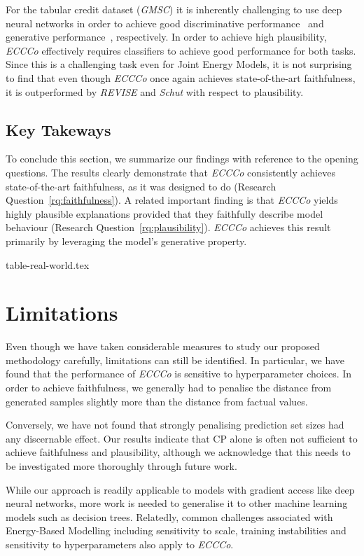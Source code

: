 \documentclass{article}
\begin{document}
For the tabular credit dataset (\textit{GMSC}) it is inherently challenging to use deep neural networks in order to achieve good discriminative performance~\citep{borisov2021deep,grinsztajn2022why} and generative performance~\citep{liu2023goggle}, respectively. In order to achieve high plausibility, \textit{ECCCo} effectively requires classifiers to achieve good performance for both tasks. Since this is a challenging task even for Joint Energy Models, it is not surprising to find that even though \textit{ECCCo} once again achieves state-of-the-art faithfulness, it is outperformed by \textit{REVISE} and \textit{Schut} with respect to plausibility.

\subsection{Key Takeways}

To conclude this section, we summarize our findings with reference to the opening questions. The results clearly demonstrate that \textit{ECCCo} consistently achieves state-of-the-art faithfulness, as it was designed to do (Research Question~\ref{rq:faithfulness}). A related important finding is that \textit{ECCCo} yields highly plausible explanations provided that they faithfully describe model behaviour (Research Question~\ref{rq:plausibility}). \textit{ECCCo} achieves this result primarily by leveraging the model's generative property.

{table-real-world.tex}

\section{Limitations}

Even though we have taken considerable measures to study our proposed methodology carefully, limitations can still be identified. In particular, we have found that the performance of \textit{ECCCo} is sensitive to hyperparameter choices. In order to achieve faithfulness, we generally had to penalise the distance from generated samples slightly more than the distance from factual values.

Conversely, we have not found that strongly penalising prediction set sizes had any discernable effect. Our results indicate that CP alone is often not sufficient to achieve faithfulness and plausibility, although we acknowledge that this needs to be investigated more thoroughly through future work.

While our approach is readily applicable to models with gradient access like deep neural networks, more work is needed to generalise it to other machine learning models such as decision trees. Relatedly, common challenges associated with Energy-Based Modelling including sensitivity to scale, training instabilities and sensitivity to hyperparameters also apply to \textit{ECCCo}.
\end{document}
